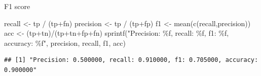 \documentclass[
  10pt,
  ignorenonframetext,
  aspectratio=169]{beamer}
\newenvironment{Shaded}{\begin{snugshade}}{\end{snugshade}}
\newcommand{\FunctionTok}[1]{\textcolor[rgb]{0.94,0.94,0.56}{#1}}
\newcommand{\NormalTok}[1]{\textcolor[rgb]{0.80,0.80,0.80}{#1}}
\newcommand{\OtherTok}[1]{\textcolor[rgb]{0.94,0.94,0.56}{#1}}
\newcommand{\SpecialCharTok}[1]{\textcolor[rgb]{0.86,0.64,0.64}{#1}}
\newcommand{\StringTok}[1]{\textcolor[rgb]{0.80,0.58,0.58}{#1}}
\begin{document}
\begin{frame}[fragile]{F1 score}
\begin{Shaded}
\begin{Highlighting}[]
\NormalTok{recall }\OtherTok{\textless{}{-}}\NormalTok{ tp }\SpecialCharTok{/}\NormalTok{ (tp}\SpecialCharTok{+}\NormalTok{fn)}
\NormalTok{precision }\OtherTok{\textless{}{-}}\NormalTok{ tp }\SpecialCharTok{/}\NormalTok{ (tp}\SpecialCharTok{+}\NormalTok{fp)}
\NormalTok{f1 }\OtherTok{\textless{}{-}} \FunctionTok{mean}\NormalTok{(}\FunctionTok{c}\NormalTok{(recall,precision))}
\NormalTok{acc }\OtherTok{\textless{}{-}}\NormalTok{ (tp}\SpecialCharTok{+}\NormalTok{tn)}\SpecialCharTok{/}\NormalTok{(tp}\SpecialCharTok{+}\NormalTok{tn}\SpecialCharTok{+}\NormalTok{fp}\SpecialCharTok{+}\NormalTok{fn)}
\FunctionTok{sprintf}\NormalTok{(}\StringTok{"Precision: \%f, recall: \%f, f1: \%f, accuracy: \%f"}\NormalTok{, precision, recall, f1, acc)}
\end{Highlighting}
\end{Shaded}

\begin{verbatim}
## [1] "Precision: 0.500000, recall: 0.910000, f1: 0.705000, accuracy: 0.900000"
\end{verbatim}
\end{frame}
\end{document}
